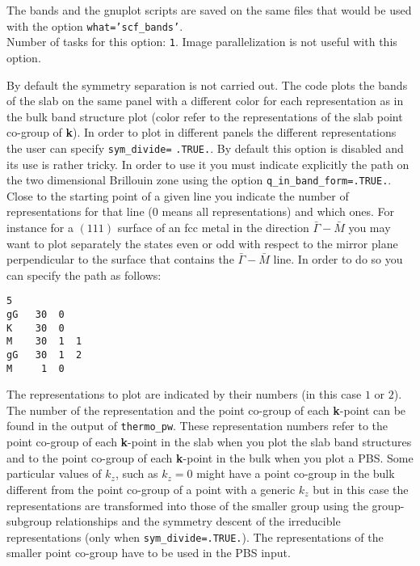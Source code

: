 \documentclass[12pt,a4paper]{article}
\begin{document}
The bands and the gnuplot scripts are saved on the same files that would
be used with the option \texttt{what='scf\_bands'}. \\
Number of tasks for this option: \texttt{1}. Image parallelization is
not useful with this option. 

By default the symmetry separation is not carried out. The code plots the
bands of the slab on the same panel with a different color for each 
representation as in the bulk band structure plot (color refer to the 
representations of the slab point co-group of {\bf k}). 
In order to plot in different panels the different representations
the user can specify \texttt{sym\_divide=} \texttt{.TRUE.}.
By default this option is disabled and its use is rather tricky.
In order to use it you must indicate explicitly the
path on the two dimensional Brillouin zone using the option
\texttt{q\_in\_band\_form=.TRUE.}. Close to the
starting point of a given line you indicate the number of 
representations for that line ($0$ means all representations) and which ones.
For instance for a $(111)$ surface of an fcc metal in the direction 
$\bar \Gamma-\bar M$ you may
want to plot separately the states even or odd with respect to the mirror
plane perpendicular to the surface that contains the $\bar \Gamma-\bar M$
line.
In order to do so you can specify the path as follows:
\begin{verbatim}
5
gG   30  0
K    30  0
M    30  1  1
gG   30  1  2
M     1  0
\end{verbatim}
The representations to plot are indicated by their numbers 
(in this case $1$ or $2$).
The number of the representation and the point co-group of each 
{\bf k}-point can be found in the output of \texttt{thermo\_pw}.
These representation numbers refer to the point co-group of each 
{\bf k}-point in the slab when you plot the slab band structures and 
to the point co-group of each {\bf k}-point in the bulk when you plot 
a PBS. Some particular values of $k_z$, such as $k_z=0$
might have a point co-group in the bulk different from the 
point co-group of a point with a generic $k_z$ but in this
case the representations are transformed into those of the smaller
group using the group-subgroup relationships and
the symmetry descent of the irreducible representations
(only when \texttt{sym\_divide=.TRUE.}). The representations of the
smaller point co-group have to be used in the PBS input.
\end{document}
